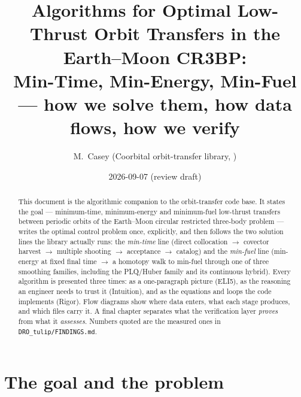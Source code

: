 \documentclass[11pt]{article}
\title{Algorithms for Optimal Low-Thrust Orbit Transfers in the Earth--Moon CR3BP:\\
Min-Time, Min-Energy, Min-Fuel --- how we solve them, how data flows, how we verify}
\author{M.~Casey \quad (Coorbital orbit-transfer library, \file{orbit\_transfer/})}
\date{2026-09-07 \quad (review draft)}
\newcommand{\file}[1]{\texttt{#1}}
\begin{document}
\maketitle

\begin{abstract}
This document is the algorithmic companion to the orbit-transfer code base. It
states the goal --- minimum-time, minimum-energy and minimum-fuel low-thrust
transfers between periodic orbits of the Earth--Moon circular restricted
three-body problem --- writes the optimal control problem once, explicitly,
and then follows the two solution lines the library actually runs:
the \emph{min-time} line (direct collocation $\to$ covector harvest $\to$
multiple shooting $\to$ acceptance $\to$ catalog) and the \emph{min-fuel} line
(min-energy at fixed final time $\to$ a homotopy walk to min-fuel through one
of three smoothing families, including the PLQ/Huber family and its
continuous hybrid). Every algorithm is presented three times: as a
one-paragraph picture (ELI5), as the reasoning an engineer needs to trust it
(Intuition), and as the equations and loops the code implements (Rigor).
Flow diagrams show where data enters, what each stage produces, and which
files carry it. A final chapter separates what the verification layer
\emph{proves} from what it \emph{assesses}. Numbers quoted are the measured
ones in \file{DRO\_tulip/FINDINGS.md}.
\end{abstract}

\tableofcontents

\section{The goal and the problem}
\end{document}
